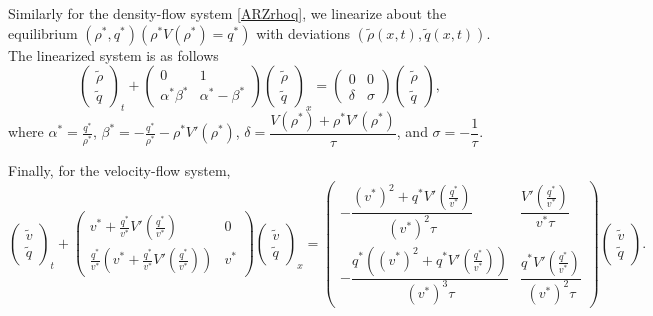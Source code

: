\documentclass[preprint]{elsarticle}
\begin{document}
Similarly for the density-flow system \eqref{ARZrhoq}, we linearize about the equilibrium $(\rho^*, q^*)(\rho^*V(\rho^*) = q^*)$ with deviations $(\tilde{\rho}(x,t), \tilde{q}(x,t))$. The linearized system is as follows 
\begin{equation} \label{rhoqlin}
\begin{pmatrix}
\tilde{\rho} \\ \tilde{q}
\end{pmatrix}_t
+ \begin{pmatrix}
0 & 1 \\
\alpha^* \beta^* & \alpha^* - \beta^* 
\end{pmatrix}
\begin{pmatrix}
\tilde{\rho} \\ \tilde{q}
\end{pmatrix}_x = 
\begin{pmatrix}
0 & 0 \\
\delta & \sigma
\end{pmatrix}
\begin{pmatrix}
\tilde{\rho} \\ \tilde{q}
\end{pmatrix},
\end{equation}
where $\alpha^* = \frac{q^*}{\rho^*}$, $\beta^* = -\frac{q^*}{\rho^*} - \rho^* V'(\rho^*)$, $\delta = \dfrac{V(\rho^*)+\rho^*V'( \rho^*)}{\tau}$, and $\sigma = -\dfrac{1}{\tau}$.

Finally, for the velocity-flow system, 
\begin{equation} \label{vqlin}
\begin{pmatrix}
\tilde{v} \\ \tilde{q}
\end{pmatrix}_t
+ \begin{pmatrix}
v^* + \frac{q^*}{v^*} V'\left(\frac{q^*}{v^*}\right) & 0 \\
\frac{q^*}{v^*} \left( v^* + \frac{q^*}{v^*} V'\left(\frac{q^*}{v^*}\right)\right) & v^*
\end{pmatrix}
\begin{pmatrix}
\tilde{v} \\ \tilde{q}
\end{pmatrix}_x = 
\begin{pmatrix}
-\dfrac{(v^*)^2+q^*V'\left(\frac{q^*}{v^*}\right)}{(v^*)^2 \tau} & \dfrac{V'\left(\frac{q^*}{v^*}\right)}{v^* \tau} \\
-\dfrac{q^*\left((v^*)^2 + q^*V'\left(\frac{q^*}{v^*}\right)\right)}{(v^*)^3 \tau}  & \dfrac{q^*V'\left(\frac{q^*}{v^*}\right)}{(v^*)^2 \tau}
\end{pmatrix}
\begin{pmatrix}
\tilde{v} \\ \tilde{q}
\end{pmatrix}.
\end{equation}
\end{document}
